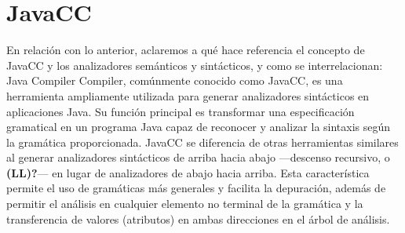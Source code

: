 

% 



% 




\section{JavaCC}
\noindent En relación con lo anterior, aclaremos a qué hace referencia el concepto de JavaCC y los analizadores semánticos y sintácticos, y como se interrelacionan:
Java Compiler Compiler, comúnmente conocido como JavaCC, es una herramienta ampliamente utilizada para generar analizadores sintácticos en aplicaciones Java. Su función principal es transformar una especificación gramatical en un programa Java capaz de reconocer y analizar la sintaxis según la gramática proporcionada.
JavaCC se diferencia de otras herramientas similares al generar analizadores sintácticos de arriba hacia abajo ---descenso recursivo, o \textbf{(LL)?}--- en lugar de analizadores de abajo hacia arriba. Esta característica permite el uso de gramáticas más generales y facilita la depuración, además de permitir el análisis en cualquier elemento no terminal de la gramática y la transferencia de valores (atributos) en ambas direcciones en el árbol de análisis.

